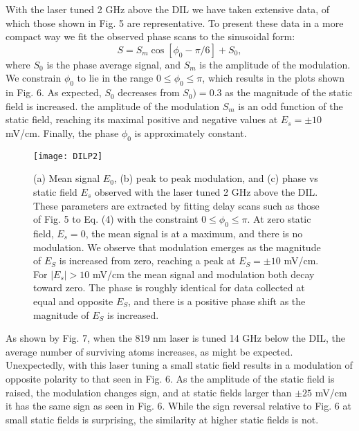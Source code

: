 \documentclass[aps,pra,preprint,groupedaddress]{revtex4-1}
\begin{document}
With the laser tuned 2 GHz above the DIL we have taken extensive data, of which those shown in Fig. 5 are representative. To present these data in a more compact way we fit the observed phase scans to the sinusoidal form:
\begin{equation} \label{eq:modfit}
S = S_m  \cos{[ \phi_0-\pi/6]} + S_0,
\end{equation}
where $S_0$ is the phase average signal, and $S_m$ is the amplitude of the modulation. We constrain $\phi_0$ to lie in the range $0\leq \phi_0\leq \pi$, which results in the plots shown in Fig. 6. As expected, $S_0$ decreases from $S_0)=0.3$  as the magnitude of the static field is increased. the amplitude of the modulation $S_m$ is an odd function of the static field, reaching its maximal positive and negative values at $E_s=\pm 10$mV/cm. Finally, the phase $\phi_0$ is approximately constant.

\begin{figure}
	\texttt{[image: DILP2]}
	\caption{(a) Mean signal $E_0$, (b) peak to peak modulation, and (c) phase vs static field $E_s$ observed with the laser tuned 2 GHz above the DIL. These parameters are extracted by fitting delay scans such as those of Fig. 5 to Eq. (4) with the constraint $0\leq\phi_0\leq\pi$. At zero static field, $E_s=0$, the mean signal is at a maximum, and there is no modulation. We observe that modulation emerges as the magnitude of $E_S$ is increased from zero, reaching a peak at $E_S = \pm 10$ mV/cm. For $|E_s|>10$ mV/cm the mean signal and modulation both decay toward zero. The phase is roughly identical for data collected at equal and opposite $E_S$, and there is a positive phase shift as the magnitude of $E_S$ is increased.}
	\label{fig:DILP2}
\end{figure}


As shown by Fig. 7, when the 819 nm laser is tuned 14 GHz below the DIL, the average number of surviving atoms increases, as might be expected. Unexpectedly, with this laser tuning a small static field results in a modulation of opposite polarity to that seen in Fig. 6. As the amplitude of the static field is raised, the modulation changes sign, and at static fields larger than $\pm25$ mV/cm it has the same sign as seen in Fig. 6. While the sign reversal relative to Fig. 6 at small static fields is surprising, the similarity at higher static fields is not.
\end{document}
